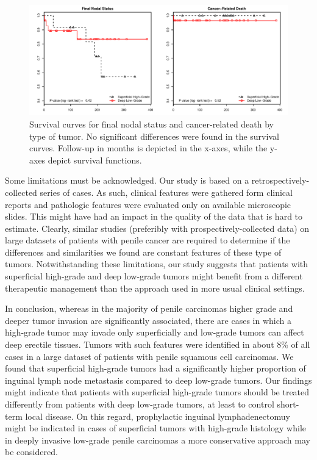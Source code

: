 \documentclass[11pt,letterpaper]{article}\usepackage[]{graphicx}\usepackage[]{color}
\makeatletter
\def\maxwidth{ %
  \ifdim\Gin@nat@width>\linewidth
    \linewidth
  \else
    \Gin@nat@width
  \fi
}
\newenvironment{knitrout}{}{} %
\makeatother
\begin{document}
\begin{multicols}{2}
\begin{figure}
\centering
\begin{knitrout}
\color{fgcolor}
\includegraphics[width=\maxwidth]{figure/Survival-1} 

\end{knitrout}
        \caption{Survival curves for final nodal status and cancer-related death by type of tumor. No significant differences were found in the survival curves. Follow-up in months is depicted in the x-axes, while the y-axes depict survival functions.}
        \label{Fig_Survival}
\end{figure}

Some limitations must be acknowledged. Our study is based on a retrospectively-collected series of cases. As such, clinical features were gathered form clinical reports and pathologic features were evaluated only on available microscopic slides. This might have had an impact in the quality of the data that is hard to estimate. Clearly, similar studies (preferibly with prospectively-collected data) on large datasets of patients with penile cancer are required to determine if the differences and similarities we found are constant features of these type of tumors. Notwithstanding these limitations, our study suggests that patients with superficial high-grade and deep low-grade tumors might benefit from a different therapeutic management than the approach used in more usual clinical settings.

In conclusion, whereas in the majority of penile carcinomas higher grade and deeper tumor invasion are significantly associated, there are cases in which a high-grade tumor may invade only superficially and low-grade tumors can affect deep erectile tissues. Tumors with such features were identified in about 8\% of all cases in a large dataset of patients with penile squamous cell carcinomas. We found that superficial high-grade tumors had a significantly higher proportion of inguinal lymph node metastasis compared to deep low-grade tumors. Our findings might indicate that patients with superficial high-grade tumors should be treated differently from patients with deep low-grade tumors, at least to control short-term local disease. On this regard, prophylactic inguinal lymphadenectomuy might be indicated in cases of superficial tumors with high-grade histology while in deeply invasive low-grade penile carcinomas a more conservative approach may be considered.


\end{multicols}
\end{document}
